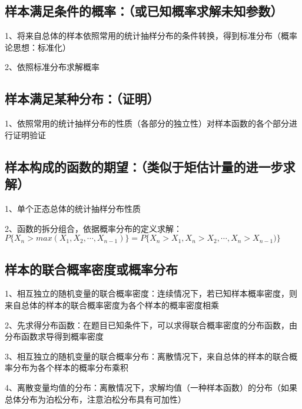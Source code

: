 \subsection{样本满足条件的概率：（或已知概率求解未知参数）}

1、将来自总体的样本依照常用的统计抽样分布的条件转换，得到标准分布（概率论思想：标准化）

2、依照标准分布求解概率



\subsection{样本满足某种分布：（证明）}

1、依照常用的统计抽样分布的性质（各部分的独立性）对样本函数的各个部分进行证明验证



\subsection{样本构成的函数的期望：（类似于矩估计量的进一步求解）}

1、单个正态总体的统计抽样分布性质

2、函数的拆分组合，依据概率分布的定义求解：$P\{ X_n > max(X_1,X_2,\cdots,X_{n-1})\} = P\{ X_n > X_1,X_n >X_2,\cdots,X_n >X_{n-1})\}$



\subsection{样本的联合概率密度或概率分布}

1、相互独立的随机变量的联合概率密度：连续情况下，若已知样本概率密度，则来自总体的样本的联合概率密度为各个样本的概率密度相乘

2、先求得分布函数：在题目已知条件下，可以求得联合概率密度的分布函数，由分布函数求导得到概率密度

3、相互独立的随机变量的联合概率分布：离散情况下，来自总体的样本的联合概率分布为各个样本的概率分布乘积

4、离散变量均值的分布：离散情况下，求解均值（一种样本函数）的分布（如果总体分布为泊松分布，注意泊松分布具有可加性）

